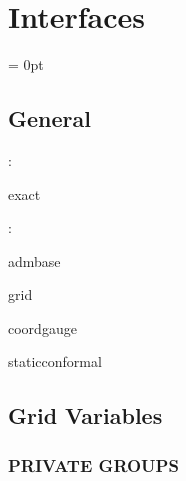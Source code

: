 
\section{Interfaces} 


\parskip = 0pt

\vspace{3mm} \subsection*{General}

: 

exact
\vspace{2mm}

: 

admbase

grid

coordgauge

staticconformal
\vspace{2mm}
\subsection*{Grid Variables}
\vspace{5mm}\subsubsection{PRIVATE GROUPS}

\vspace{5mm}

